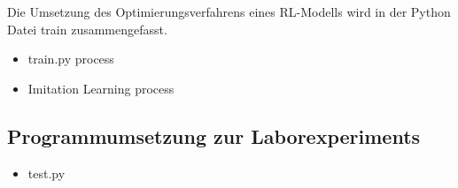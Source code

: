 Die Umsetzung des Optimierungsverfahrens eines RL-Modells wird in der Python Datei train zusammengefasst.
\begin{itemize}
    \item train.py process
    \item Imitation Learning process
\end{itemize}

\subsection{Programmumsetzung zur Laborexperiments}
\begin{itemize}
    \item test.py
\end{itemize}